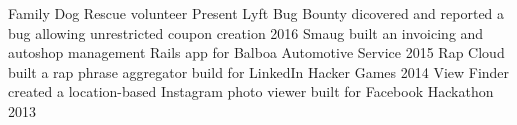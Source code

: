 \begin{cvhonors}
  \cvhonor
    {Family Dog Rescue}
    {volunteer}
    {}
    {Present}
  \cvhonor
    {Lyft Bug Bounty}
    {dicovered and reported a bug allowing unrestricted coupon creation}
    {}
    {2016}
  \cvhonor
    {Smaug}
    {built an invoicing and autoshop management Rails app for Balboa Automotive Service}
    {}
    {2015}
  \cvhonor
    {Rap Cloud}
    {built a rap phrase aggregator build for LinkedIn Hacker Games}
    {}
    {2014}
  \cvhonor
    {View Finder}
    {created a location-based Instagram photo viewer built for Facebook Hackathon}
    {}
    {2013}
\end{cvhonors}
